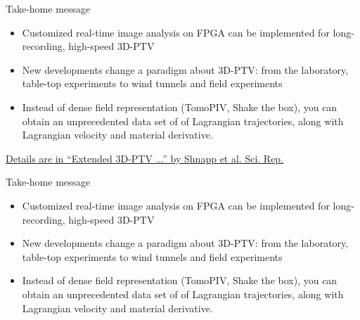 \documentclass[aspectratio=43]{beamer}
\begin{document}

\begin{frame}{Take-home message}
\begin{itemize}
\item Customized real-time image analysis on FPGA can be implemented for long-recording, high-speed 3D-PTV
\item New developments change a paradigm about 3D-PTV: from the laboratory, table-top experiments to wind tunnels and field experiments
\item Instead of dense field representation (TomoPIV, Shake the box),  you can obtain an unprecedented data set of of Lagrangian trajectories, along with Lagrangian velocity and material derivative. 
\end{itemize}

\begin{cardTiny}\href{https://www.nature.com/articles/s41598-019-43555-2}{Details are in ``Extended 3D-PTV ...'' by Shnapp et al. Sci. Rep.}
\end{cardTiny}

\end{frame}
%

%
%

	 



\begin{frame}{Take-home message}
\begin{itemize}
\item Customized real-time image analysis on FPGA can be implemented for long-recording, high-speed 3D-PTV
\item New developments change a paradigm about 3D-PTV: from the laboratory, table-top experiments to wind tunnels and field experiments
\item Instead of dense field representation (TomoPIV, Shake the box),  you can obtain an unprecedented data set of of Lagrangian trajectories, along with Lagrangian velocity and material derivative. 
\end{itemize}
\end{frame}
\end{document}
